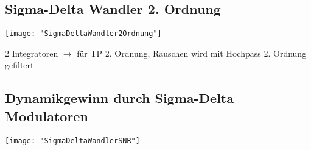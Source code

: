 

\subsection{Sigma-Delta Wandler 2. Ordnung}
\begin{minipage}[t]{0.3\textwidth}
	\vspace{0pt}
	\texttt{[image: "SigmaDeltaWandler2Ordnung"]}
\end{minipage}\hspace{0.05\textwidth}
\begin{minipage}[t]{0.3\textwidth}
	\vspace{0pt}
	2 Integratoren $\rightarrow$ für TP 2. Ordnung, Rauschen wird mit Hochpass 2. Ordnung gefiltert.
\end{minipage}\hspace{0.05\textwidth}
\begin{minipage}[t]{0.3\textwidth}
	\vspace{0pt}
	
\end{minipage}
\vspace{2mm}



\subsection{Dynamikgewinn durch Sigma-Delta Modulatoren}
\begin{minipage}[t]{0.3\textwidth}
	\vspace{0pt}
	\texttt{[image: "SigmaDeltaWandlerSNR"]}
\end{minipage}\hspace{0.05\textwidth}
\begin{minipage}[t]{0.3\textwidth}
	\vspace{0pt}
\end{minipage}\hspace{0.05\textwidth}
\begin{minipage}[t]{0.3\textwidth}
	\vspace{0pt}
	
\end{minipage}
\vspace{2mm}

